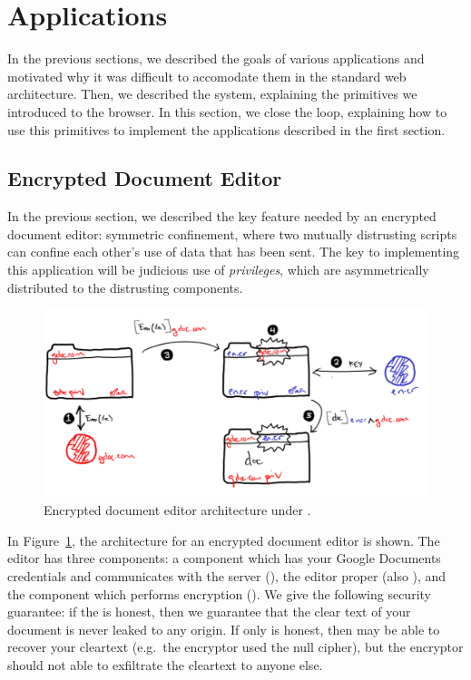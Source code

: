 \section{Applications}
\label{sec:apps}

In the previous sections, we described the goals of various applications
and motivated why it was difficult to accomodate them in the standard
web architecture.  Then, we described the \sys{} system, explaining the
primitives we introduced to the browser.  In this section, we close the
loop, explaining how to use this primitives to implement the
applications described in the first section.

\subsection{Encrypted Document Editor}

In the previous section, we described the key feature needed by an
encrypted document editor: symmetric confinement, where two mutually
distrusting scripts can confine each other's use of data that has been
sent.  The key to implementing this application will be judicious use of
\emph{privileges}, which are asymmetrically distributed to the
distrusting components.

\begin{figure}
\centerline{\includegraphics[width=\columnwidth]{editor2-byhand}}
\caption{\label{fig:editor} Encrypted document editor architecture
under \sys{}.}
\end{figure}

In Figure~\ref{fig:editor}, the architecture for an encrypted document
editor is shown.  The editor has three components: a component which has
your Google Documents credentials and communicates with the server (), the
editor proper (also ), and the component which performs encryption ().  We give the
following security guarantee: if the  is honest, then we
guarantee that the clear text of your document is never leaked to any
origin.  If only  is honest, then  may
be able to recover your cleartext (e.g.\ the encryptor used the null
cipher), but the encryptor should not able to exfiltrate the cleartext
to anyone else.

